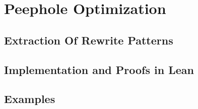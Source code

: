 \chapter{Peephole Optimization}

\section{Extraction Of Rewrite Patterns}
\section{Implementation and Proofs in Lean}
\section{Examples}
